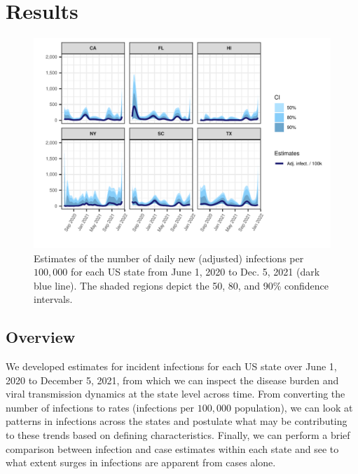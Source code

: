 \documentclass{article}
\begin{document}
\section{Results}
\begin{figure}[!tb]
\centering
    \includegraphics[width=.99\textwidth]{state_nia_est_faceted.pdf} %
    \caption{Estimates of the number of daily new (adjusted) infections per $100,000$ for each US state from June 1, 2020 to Dec. 5, 2021 (dark blue line). The shaded regions depict the 50, 80, and 90\% confidence intervals.}
    \label{fig:state_nia_est_faceted}
\end{figure}

\subsection{Overview}
We developed estimates for incident infections for each US state over June 1, 2020 to December 5, 2021, from which we can inspect the disease burden and viral transmission dynamics at the state level across time. From converting the number of infections to rates (infections per $100,000$ population), we can look at patterns in infections across the states and postulate what may be contributing to these trends based on defining characteristics. Finally, we can perform a brief comparison between infection and case estimates within each state and see to what extent surges in infections are apparent from cases alone. %
\end{document}
